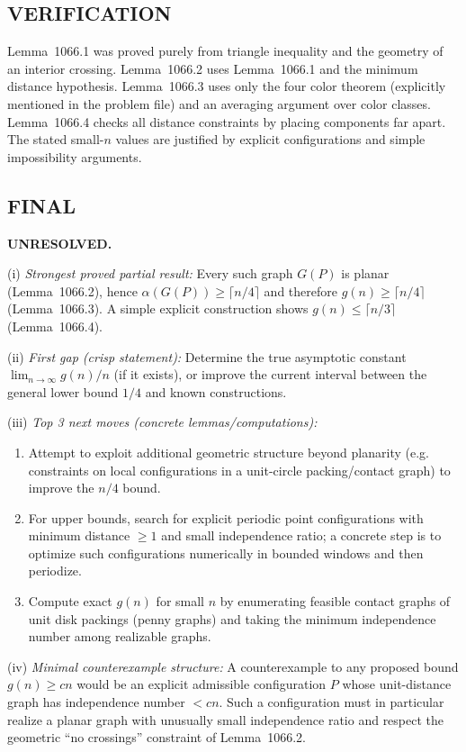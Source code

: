 \subsection*{VERIFICATION}
Lemma~1066.1 was proved purely from triangle inequality and the geometry of an interior crossing.
Lemma~1066.2 uses Lemma~1066.1 and the minimum distance hypothesis.
Lemma~1066.3 uses only the four color theorem (explicitly mentioned in the problem file) and an averaging argument over color classes.
Lemma~1066.4 checks all distance constraints by placing components far apart.
The stated small-$n$ values are justified by explicit configurations and simple impossibility arguments.

\subsection*{FINAL}
\textbf{UNRESOLVED.}

(i) \emph{Strongest proved partial result:}
Every such graph $G(P)$ is planar (Lemma~1066.2), hence $\alpha(G(P))\ge \lceil n/4\rceil$ and therefore $g(n)\ge \lceil n/4\rceil$ (Lemma~1066.3).  A simple explicit construction shows $g(n)\le \lceil n/3\rceil$ (Lemma~1066.4).

(ii) \emph{First gap (crisp statement):}
Determine the true asymptotic constant $\lim_{n\to\infty} g(n)/n$ (if it exists), or improve the current interval between the general lower bound $1/4$ and known constructions.

(iii) \emph{Top 3 next moves (concrete lemmas/computations):}
\begin{enumerate}
\item Attempt to exploit additional geometric structure beyond planarity (e.g. constraints on local configurations in a unit-circle packing/contact graph) to improve the $n/4$ bound.
\item For upper bounds, search for explicit periodic point configurations with minimum distance $\ge 1$ and small independence ratio; a concrete step is to optimize such configurations numerically in bounded windows and then periodize.
\item Compute exact $g(n)$ for small $n$ by enumerating feasible contact graphs of unit disk packings (penny graphs) and taking the minimum independence number among realizable graphs.
\end{enumerate}

(iv) \emph{Minimal counterexample structure:}
A counterexample to any proposed bound $g(n)\ge c n$ would be an explicit admissible configuration $P$ whose unit-distance graph has independence number $<c n$.  Such a configuration must in particular realize a planar graph with unusually small independence ratio and respect the geometric ``no crossings'' constraint of Lemma~1066.2.




